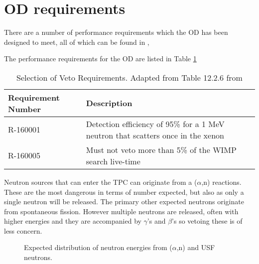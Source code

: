 \section{OD requirements}

\par
There are a number of performance requirements which the OD has been designed to meet, all of which can be found in \cite{LZ_TechnicalDesignReview_ref}, 

\par
The performance requirements for the OD are listed in Table \ref{tab:veto_requirements}

\begin{table}[!htbp]
    \centering
    \begin{tabular}{p{}p{}} %
    \hline
    {Requirement Number} & {Description} \\ \hline
    R-160001             & Detection efficiency of 95\% for a 1 MeV neutron that scatters once in the xenon \\
    R-160005             & Must not veto more than 5\% of the WIMP search live-time
    \end{tabular}
    \caption{Selection of Veto Requirements. Adapted from Table 12.2.6 from \cite{LZ_TechnicalDesignReview_ref}}
    \label{tab:veto_requirements}
\end{table} 

\par
Neutron sources that can enter the TPC can originate from a ($\alpha$,n) reactions.
These are the most dangerous in terms of number expected, but also as only a single neutron will be released.
The primary other expected neutrons originate from spontaneous fission.
However multiple neutrons are released, often with higher energies and they are accompanied by $\gamma$'s and $\beta$'s so vetoing these is of less concern.

\begin{figure}[!htbp]
    \centering
    \caption{Expected distribution of neutron energies from ($\alpha$,n) and USF neutrons.}
    \label{fig:simulation_background_neutron_energies}
\end{figure}


